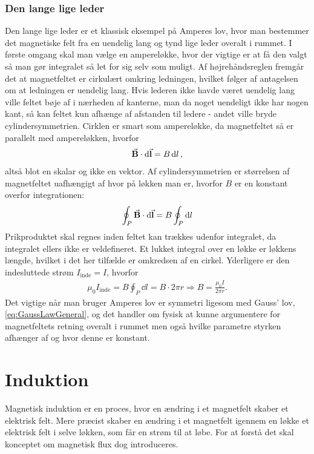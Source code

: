 \subsubsection{Den lange lige leder} \label{sec:lang_lige_leder}
Den lange lige leder er et klassisk eksempel på Amperes lov, hvor man bestemmer det magnetiske felt fra en uendelig lang og tynd lige leder overalt i rummet. I første omgang skal man vælge en ampereløkke, hvor der vigtige er at få den valgt så man gør integralet så let for sig selv som muligt. Af højrehåndsreglen fremgår det at magnetfeltet er cirkulært omkring ledningen, hvilket følger af antagelsen om at ledningen er uendelig lang. Hvis lederen ikke havde været uendelig lang ville feltet bøje af i nærheden af kanterne, man da noget uendeligt ikke har nogen kant, så kan feltet kun afhænge af afstanden til ledere - andet ville bryde cylindersymmetrien. Cirklen er smart som ampereløkke, da magnetfeltet så er parallelt med ampereløkken, hvorfor
%
\begin{align}
    \va B \cdot \dd{\va{l}} = B\dd{l},
\end{align}
%
altså blot en skalar og ikke en vektor. Af cylindersymmetrien er størrelsen af magnetfeltet uafhængigt af hvor på løkken man er, hvorfor $B$ er en konstant overfor integrationen:
%
\begin{align}
    \oint_P \va B \cdot \dd{\va{l}} = B \oint_P \dd{l}
\end{align}
%
Prikproduktet skal regnes inden feltet kan trækkes udenfor integralet, da integralet ellers ikke er veldefineret. Et lukket integral over en løkke er løkkens længde, hvilket i det her tilfælde er omkredsen af en cirkel. Yderligere er den indesluttede strøm $I_\mathrm{inde} = I$, hvorfor
%
\begin{align} \label{eq:lang_lige_leder}
    \mu_0I_\mathrm{inde} = B\oint_P \dd{l} = B \cdot 2\pi r  \Rightarrow  B = \frac{\mu_0I}{2\pi r}.
\end{align}
%
Det vigtige når man bruger Amperes lov er symmetri ligesom med Gauss' lov, \eqref{eq:GaussLawGeneral}, og det handler om fysisk at kunne argumentere for magnetfeltets retning overalt i rummet men også hvilke parametre styrken afhænger af og hvor denne er konstant.

\section{Induktion}
Magnetisk induktion er en proces, hvor en ændring i et magnetfelt skaber et elektrisk felt. Mere præcist skaber en ændring i et magnetfelt igennem en løkke et elektrisk felt i selve løkken, som får en strøm til at løbe. For at forstå det skal konceptet om magnetisk flux dog introduceres.

